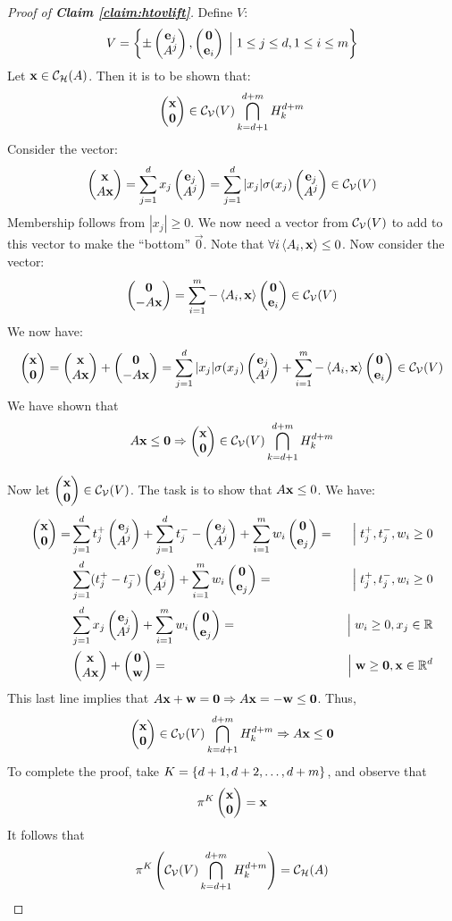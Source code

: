 \documentclass[a4,fleqn]{article}
\begin{document}
\begin{proof}[Proof of \textnormal{\textbf{Claim \ref{claim:htovlift}}}]
Define $V$:
\[ V = \bset{\pm\svec{\e_j}{A^j}, \svec{\vec{0}}{\e_i} \Suchthat 1\leq j \leq d, 1 \leq i \leq m} \]
Let $\mathbf{x} \in \mathcal{C}_{\mathcal{H}}(A)$.  Then it is to be shown that:
\[ \svec{\x}{\vec{0}} \in \CV(V) \bigcap_{k=d+1}^{d+m} H_k^{d+m} \]
Consider the vector:
\[ \svec{\x}{A\x} = \sum_{j=1}^{d} x_j \svec{\e_j}{A^j} = 
   \sum_{j=1}^{d} |x_j| \sigma(x_j) \svec{\e_j}{A^j} \in \CV(V) \]
Membership follows from $|x_j| \geq 0$.  We now need a vector from $\mathcal{C}_{\mathcal{V}}(V)$ to add to this vector to make the ``bottom'' $\vec{0}$.  Note that $\forall i \left\langle A_i, \mathbf{x} \right\rangle \leq 0$.  Now consider the vector:
\[ \svec{\vec{0}}{-A\x} = 
   \sum_{i=1}^{m} -\dotproduct{A_i}{\x}\svec{\vec{0}}{\e_i} \in \CV(V)
\]
We now have:
\[ \svec{\x}{\vec{0}} = \svec{\x}{A\x} + \svec{\vec{0}}{-A\x} =
   \sum_{j=1}^{d} |x_j| \sigma(x_j) \svec{\e_j}{A^j} + 
   \sum_{i=1}^{m} -\dotproduct{A_i}{\x}\svec{\vec{0}}{\e_i} \in \CV(V)
\]
We have shown that 
\[ A\x \leq \vec{0} \Rightarrow \svec{\x}{\vec{0}} 
      \in \CV(V) \bigcap_{k=d+1}^{d+m} H_k^{d+m} \]

Now let $\svec{\x}{\vec{0}} \in \CV(V)$.  The task is to show that $A\mathbf{x} \leq 0$.  We have:
\begin{align*} 
   \svec{\x}{\vec{0}} = &\sum_{j=1}^{d} t_j^+ \svec{\e_j}{A^j} +
                        \sum_{j=1}^{d} t_j^- -\svec{\e_j}{A^j} +
                        \sum_{i=1}^{m} w_i \svec{\vec{0}}{\e_j} =&\Suchthat
                        t_j^+,t_j^-,w_i \geq 0 \\
                        &\sum_{j=1}^{d} (t_j^+-t_j^-) \svec{\e_j}{A^j} +
                        \sum_{i=1}^{m} w_i \svec{\vec{0}}{\e_j} =&\Suchthat
                        t_j^+,t_j^-,w_i \geq 0 \\
                        &\sum_{j=1}^{d} x_j \svec{\e_j}{A^j} +
                        \sum_{i=1}^{m} w_i \svec{\vec{0}}{\e_j} =&\Suchthat
                        w_i \geq 0, x_j \in \R \\
                        &\svec{\x}{A\x} + \svec{\vec{0}}{\w}    =&\Suchthat
                        \w \geq \vec{0}, \x \in \R^d
\end{align*} 
This last line implies that $A\mathbf{x} + \mathbf{w} = \mathbf{0} \Rightarrow A\mathbf{x} = -\mathbf{w} \leq \mathbf{0}$.  Thus,
\[ \svec{\x}{\vec{0}} \in \CV(V) \bigcap_{k=d+1}^{d+m} H_k^{d+m} \Rightarrow
      A\x \leq \vec{0} \]
To complete the proof, take $K = \left\{d+1,d+2,\dots,d+m\right\}$, and observe that 
  \[\pi^K\svec{\x}{\vec{0}} = \x \]
It follows that
  \[\pi^K\left(\mathcal{C}_{\mathcal{V}}(V) \bigcap_{k=d+1}^{d+m} H_k^{d+m}\right) = \mathcal{C}_{\mathcal{H}}(A) \]
\end{proof}
\end{document}

